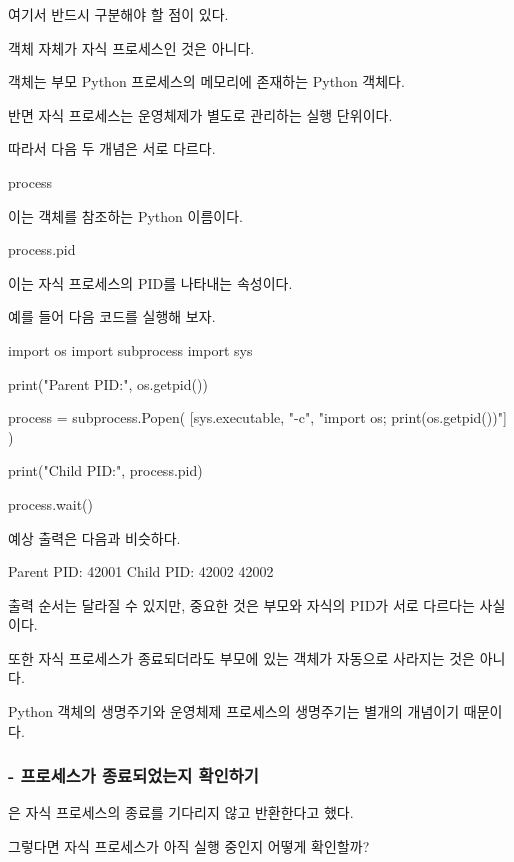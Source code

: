 여기서 반드시 구분해야 할 점이 있다.

 객체 자체가 자식 프로세스인 것은 아니다.

 객체는 부모 Python 프로세스의 메모리에 존재하는 Python 객체다.

반면 자식 프로세스는 운영체제가 별도로 관리하는 실행 단위이다.

따라서 다음 두 개념은 서로 다르다.

\begin{dhkzsh}
process
\end{dhkzsh}

이는  객체를 참조하는 Python 이름이다.

\begin{dhkzsh}
process.pid
\end{dhkzsh}

이는 자식 프로세스의 PID를 나타내는 속성이다.

예를 들어 다음 코드를 실행해 보자.

\begin{dhkcode}
import os
import subprocess
import sys

print("Parent PID:", os.getpid())

process = subprocess.Popen(
    [sys.executable, "-c", "import os; print(os.getpid())"]
)

print("Child PID:", process.pid)

process.wait()
\end{dhkcode}

예상 출력은 다음과 비슷하다.

\begin{dhkzsh}
Parent PID: 42001
Child PID: 42002
42002
\end{dhkzsh}

출력 순서는 달라질 수 있지만, 중요한 것은 부모와 자식의 PID가 서로 다르다는 사실이다.

또한 자식 프로세스가 종료되더라도 부모에 있는  객체가 자동으로 사라지는 것은 아니다.

Python 객체의 생명주기와 운영체제 프로세스의 생명주기는 별개의 개념이기 때문이다.

\subsubsection{ - 프로세스가 종료되었는지 확인하기}

은 자식 프로세스의 종료를 기다리지 않고 반환한다고 했다.

그렇다면 자식 프로세스가 아직 실행 중인지 어떻게 확인할까?

